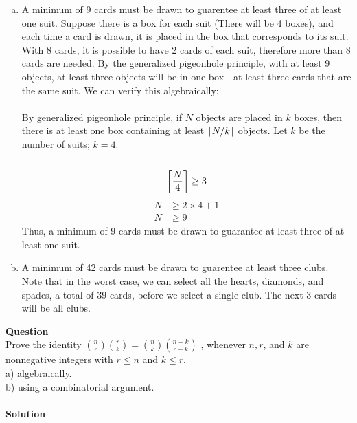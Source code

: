 \documentclass[article, 11pt]{article}
\newcounter{question}
\def\questionnum{{\Large\bfseries{Question \arabic{question} }}\\[1em]}
\newcommand{\question}{
    \stepcounter{question}
    \questionnum
}
\newcommand{\solution}{
    {{\large\bfseries{Solution}}}
}
\DeclarePairedDelimiter\ceil{\lceil}{\rceil} %
\begin{document}
\begin{enumerate}[a)]
    \item 
    A minimum of 9 cards must be drawn to guarentee at least three of at least one suit. Suppose there is a box for each suit (There will be 4 boxes), and each time a card is drawn, it is placed in the box that corresponds to its suit. With 8 cards, it is possible to have 2 cards of each suit, therefore more than 8 cards are needed. By the generalized pigeonhole principle, with at least 9 objects, at least three objects will be in one box---at least three cards that are the same suit. We can verify this algebraically: \\
    \\
    By generalized pigeonhole principle, if $N$ objects are placed in $k$ boxes, then there is at least one box containing at least $\ceil*{N/k}$ objects. Let $k$ be the number of suits; $k=4$. \\
    \\
    \[ \ceil*{\frac{N}{4}} \geq 3 \]
    \begin{align*}
        N &\geq 2 \times 4 + 1 \\
        N &\geq 9
    \end{align*}
    Thus, a minimum of 9 cards must be drawn to guarantee at least three of at least one suit.
    \item 
    A minimum of 42 cards must be drawn to guarentee at least three clubs. Note that in the worst case, we can select all the hearts, diamonds, and spades, a total of 39 cards, before we select a single club. The next 3 cards will be all clubs.  
\end{enumerate}
\newpage
\question
Prove the identity $\binom{n}{r}\binom{r}{k}=\binom{n}{k}\binom{n-k}{r-k}$ , whenever $n, r$, and $k$ are nonnegative integers with $r \leq n$ and $k \leq r$,\\a) algebraically.\\ b) using a combinatorial argument. \\
\\
\solution 
\end{document}
